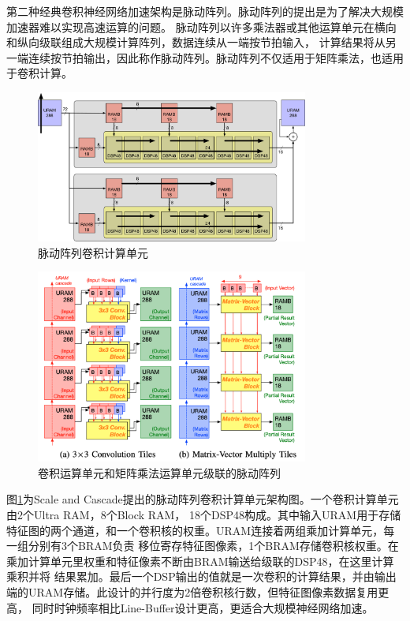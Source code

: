 第二种经典卷积神经网络加速架构是脉动阵列。脉动阵列的提出是为了解决大规模加速器难以实现高速运算的问题。
脉动阵列以许多乘法器或其他运算单元在横向和纵向级联组成大规模计算阵列，数据连续从一端按节拍输入，
计算结果将从另一端连续按节拍输出，因此称作脉动阵列。脉动阵列不仅适用于矩阵乘法，也适用于卷积计算。

\begin{figure}[h]
	\centering
	\includegraphics[width=0.8\textwidth]{figure/array}
	\caption{脉动阵列卷积计算单元} 
	\label{fig:sys}
\end{figure}


\begin{figure}[h]
	\centering
	\includegraphics[width=0.8\textwidth]{figure/cascade}
	\caption{卷积运算单元和矩阵乘法运算单元级联的脉动阵列} 
	\label{fig:cas}
\end{figure}

图\ref{fig:sys}为Scale and Cascade提出的脉动阵列卷积计算单元架构图。一个卷积计算单元由2个Ultra RAM，8个Block RAM，
18个DSP48构成。其中输入URAM用于存储特征图的两个通道，和一个卷积核的权重。URAM连接着两组乘加计算单元，每一组分别有3个BRAM负责
移位寄存特征图像素，1个BRAM存储卷积核权重。在乘加计算单元里权重和特征像素不断由BRAM输送给级联的DSP48，在这里计算乘积并将
结果累加。最后一个DSP输出的值就是一次卷积的计算结果，并由输出端的URAM存储。此设计的并行度为2倍卷积核行数，但特征图像素数据复用更高，
同时时钟频率相比Line-Buffer设计更高，更适合大规模神经网络加速。

